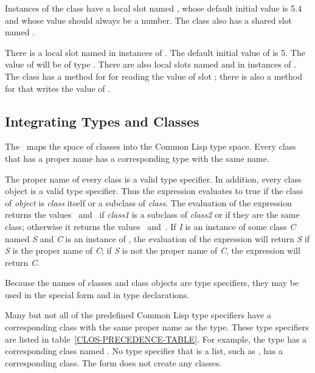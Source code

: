 Instances of the class  have a local slot named , whose default
initial value is 5.4 and whose value should always be a number.
The class  also has a shared slot named .

There is a local slot named  in instances of .  The
default initial value of  is 5.  The value of  will be
of type .  There are also local slots named
 and  in instances of .  The class 
has a method for  for reading the value of slot ;
there is also a method for  that writes the
value of .


\subsection{Integrating Types and Classes} 
\label{Integrating-Types-and-Classes-SECTION} 

The \CLOS\ maps the space of classes into the Common Lisp type space.
Every class that has a proper name has a corresponding type with the same 
name.  

The proper name of every class is a valid type specifier.  In
addition, every class object is a valid type specifier.  Thus the
expression  evaluates to true if the
class of \emph{object\/} is \emph{class\/} itself or a subclass of {\it
class}.  The evaluation of the expression  returns the values ~and~ if \emph{class1\/} is a
subclass of \emph{class2\/} or if they are the same class; otherwise it
returns the values ~and~.  If \emph{I} is an instance of some class
\emph{C} named \emph{S} and \emph{C} is an instance of , the
evaluation of the expression  will return \emph{S} if
\emph{S} is the proper name of \emph{C\/}; if \emph{S} is not the proper
name of \emph{C}, the expression  will
return \emph{C}.

Because the names of classes and class objects are type specifiers, they may
be used in the special form  and in type declarations.

Many but not all of the predefined Common Lisp type specifiers have a
corresponding class with the same proper name as the type.  These type
specifiers are listed in table~\ref{CLOS-PRECEDENCE-TABLE}.  For example, the
type  has a corresponding class named .  No type specifier
that is a list, such as , has a corresponding
class. The form  does not create any classes.

